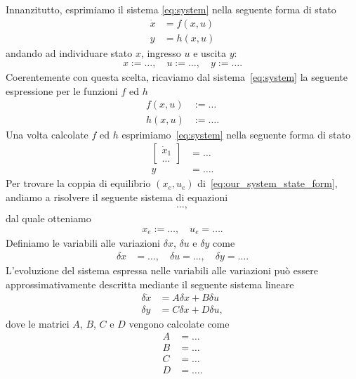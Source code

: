 \documentclass[a4paper, 11pt]{article}
\begin{document}
Innanzitutto, esprimiamo il sistema \eqref{eq:system} nella seguente forma di stato
\begin{subequations}
\begin{align}\label{eq:state_form}
	\dot{x} &= f(x,u) \\
	y &= h(x,u)
\end{align}
\end{subequations}
andando ad individuare stato $x$, ingresso $u$ e uscita $y$:
%
\begin{align*}
	x := \dots, \quad u := \dots, \quad y := \dots.
\end{align*}
%
Coerentemente con questa scelta, ricaviamo dal sistema~\eqref{eq:system} la seguente espressione per le funzioni $f$ ed $h$
%
\begin{align*}
	f(x,u) &:= \dots
	\\
	h(x,u) &:= \dots.
\end{align*}
%
Una volta calcolate $f$ ed $h$ esprimiamo~\eqref{eq:system} nella seguente forma di stato
%
\begin{subequations}\label{eq:our_system_state_form}
\begin{align}
	\begin{bmatrix}
		\dot{x}_1
		\\
		\dots
	\end{bmatrix} &= \dots \label{eq:state_form_1}
	\\
	y &= \dots.
\end{align}
\end{subequations}
%
Per trovare la coppia di equilibrio $(x_e, u_e)$ di~\eqref{eq:our_system_state_form}, andiamo a risolvere il seguente sistema di equazioni
%
\begin{align}
	\dots,
\end{align}
%
dal quale otteniamo
%
\begin{align}
	x_e := \dots,  \quad u_e = \dots.\label{eq:equilibirum_pair}
\end{align}
%
Definiamo le variabili alle variazioni $\delta x$, $\delta u$ e $\delta y$ come 
%
\begin{align*}
	\delta x &= \dots, 
	\quad
	\delta u = \dots, 
	\quad
	\delta y = \dots.
\end{align*}
%
L'evoluzione del sistema espressa nelle variabili alle variazioni pu\`o essere approssimativamente descritta mediante il seguente sistema lineare
%
\begin{subequations}\label{eq:linearized_system}
\begin{align}
	\delta \dot{x} &= A\delta x + B\delta u
	\\
	\delta y &= C\delta x + D\delta u,
\end{align}
\end{subequations}
%
dove le matrici $A$, $B$, $C$ e $D$ vengono calcolate come
%
\begin{subequations}\label{eq:matrices}
\begin{align}
	A &= \dots
	\\
	B &= \dots
	\\
	C &= \dots
	\\
	D &= \dots.
\end{align}
\end{subequations}
%
\end{document}

